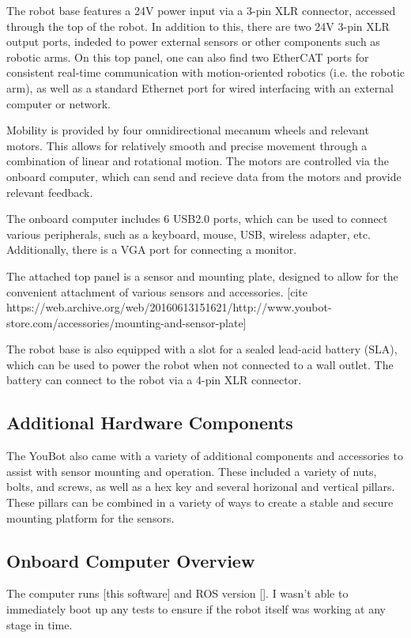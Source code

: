 \documentclass[a4paper, 12pt]{article}
\newif\ifshownotes
\newcommand{\notes}[1]{\ifshownotes\textcolor{blue}{#1}\fi}
\begin{document}
    The robot base features a 24V power input via a 3-pin XLR connector, accessed through the top of the robot. In addition to this, there are two 24V 3-pin XLR output ports, indeded to power external sensors or other components such as robotic arms. On this top panel, one can also find two EtherCAT ports for consistent real-time communication with motion-oriented robotics (i.e. the robotic arm), as well as a standard Ethernet port for wired interfacing with an external computer or network. 

    Mobility is provided by four omnidirectional mecanum wheels and relevant motors. This allows for relatively smooth and precise movement through a combination of linear and rotational motion. The motors are controlled via the onboard computer, which can send and recieve data from the motors and provide relevant feedback.

    The onboard computer includes 6 USB2.0 ports, which can be used to connect various peripherals, such as a keyboard, mouse, USB, wireless adapter, etc. Additionally, there is a VGA port for connecting a monitor. \cite{githubYoubotOverview}  

    The attached top panel is a sensor and mounting plate, designed to allow for the convenient attachment of various sensors and accessories. [cite https://web.archive.org/web/20160613151621/http://www.youbot-store.com/accessories/mounting-and-sensor-plate]

    The robot base is also equipped with a slot for a sealed lead-acid battery (SLA), which can be used to power the robot when not connected to a wall outlet. The battery can connect to the robot via a 4-pin XLR connector. 

    \subsection{Additional Hardware Components}

    
    \notes{DESCRIBE THE INITIAL INSPECTION IN FULL HERE! TALK ABOUT THE PILLAR STUFF AND NUTS AND WHATNOT AS WELL!!!!}

    The YouBot also came with a variety of additional components and accessories to assist with sensor mounting and operation. These included a variety of nuts, bolts, and screws, as well as a hex key and several horizonal and vertical pillars. These pillars can be combined in a variety of ways to create a stable and secure mounting platform for the sensors. 

    \subsection{Onboard Computer Overview}
    The computer runs [this software] and ROS version []. I wasn't able to immediately boot up any tests to ensure if the robot itself was working at any stage in time. 
\end{document}
